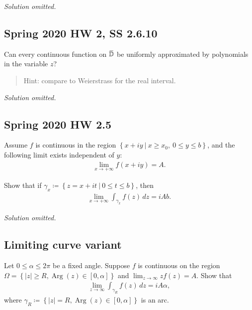 \emph{Solution omitted.}

\hypertarget{spring-2020-hw-2-ss-2.6.10}{%
\subsection{Spring 2020 HW 2, SS
2.6.10}\label{spring-2020-hw-2-ss-2.6.10}}

\begin{problem}[?]

Can every continuous function on
\(\mkern 1.5mu\overline{\mkern-1.5mu{\mathbb{D}}\mkern-1.5mu}\mkern 1.5mu\)
be uniformly approximated by polynomials in the variable \(z\)?

\begin{quote}
Hint: compare to Weierstrass for the real interval.
\end{quote}

\end{problem}

\emph{Solution omitted.}

\hypertarget{spring-2020-hw-2.5}{%
\subsection{Spring 2020 HW 2.5}\label{spring-2020-hw-2.5}}

\begin{problem}[?]

Assume \(f\) is continuous in the region
\(\left\{{x+iy {~\mathrel{\Big\vert}~}x\geq x_0, ~ 0\leq y \leq b}\right\}\),
and the following limit exists independent of \(y\):
\begin{align*}
\lim_{x\to +\infty}f(x+iy) = A
.\end{align*}

Show that if
\(\gamma_x \coloneqq\left\{{z = x+it {~\mathrel{\Big\vert}~}0 \leq t \leq b}\right\}\),
then
\begin{align*}
\lim_{x\to +\infty} \int_{\gamma_x} f(z) \,dz = iAb
.\end{align*}

\end{problem}

\emph{Solution omitted.}

\hypertarget{limiting-curve-variant}{%
\subsection{Limiting curve variant}\label{limiting-curve-variant}}

\begin{problem}[?]

Let \(0\leq \alpha \leq 2\pi\) be a fixed angle. Suppose \(f\) is
continuous on the region
\(\Omega = \left\{{{\left\lvert {z} \right\rvert} \geq R, \operatorname{Arg}(z) \in [0, \alpha]}\right\}\)
and \(\lim_{z\to \infty} zf(z) = A\). Show that
\begin{align*}
\lim_{z\to \infty} \int_{\gamma_R} f(z) \,dz= iA\alpha
,\end{align*}
where
\(\gamma_R \coloneqq\left\{{ {\left\lvert {z} \right\rvert} = R, \operatorname{Arg}(z) \in [0, \alpha]}\right\}\)
is an arc.

\end{problem}


